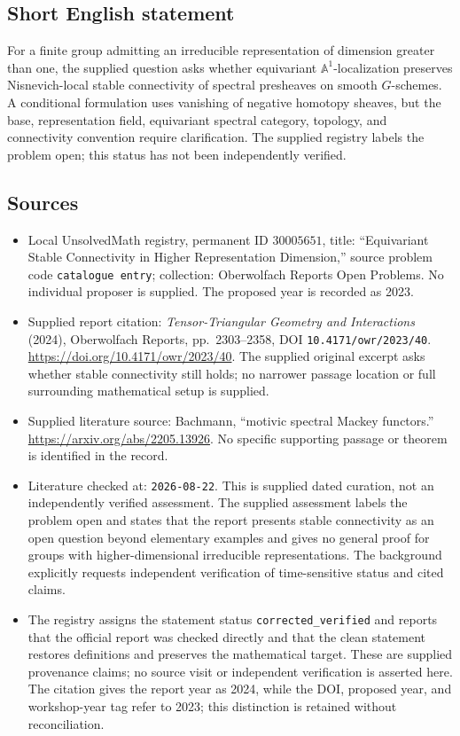 \documentclass[11pt]{article}
\begin{document}
\subsection{Short English statement}
For a finite group admitting an irreducible representation of dimension greater than one, the supplied question asks whether equivariant \(\mathbb A^{1}\)-localization preserves Nisnevich-local stable connectivity of spectral presheaves on smooth \(G\)-schemes. A conditional formulation uses vanishing of negative homotopy sheaves, but the base, representation field, equivariant spectral category, topology, and connectivity convention require clarification. The supplied registry labels the problem open; this status has not been independently verified.
\subsection{Sources}
\begin{itemize}
\item Local UnsolvedMath registry, permanent ID \(30005651\), title: ``Equivariant Stable Connectivity in Higher Representation Dimension,'' source problem code \texttt{catalogue entry}; collection: Oberwolfach Reports Open Problems. No individual proposer is supplied. The proposed year is recorded as 2023.
\item Supplied report citation: \emph{Tensor-Triangular Geometry and Interactions} (2024), Oberwolfach Reports, pp.\ 2303--2358, DOI \texttt{10.4171/owr/2023/40}. \url{https://doi.org/10.4171/owr/2023/40}. The supplied original excerpt asks whether stable connectivity still holds; no narrower passage location or full surrounding mathematical setup is supplied.
\item Supplied literature source: Bachmann, ``motivic spectral Mackey functors.'' \url{https://arxiv.org/abs/2205.13926}. No specific supporting passage or theorem is identified in the record.
\item Literature checked at: \texttt{2026-08-22}. This is supplied dated curation, not an independently verified assessment. The supplied assessment labels the problem open and states that the report presents stable connectivity as an open question beyond elementary examples and gives no general proof for groups with higher-dimensional irreducible representations. The background explicitly requests independent verification of time-sensitive status and cited claims.
\item The registry assigns the statement status \texttt{corrected\_verified} and reports that the official report was checked directly and that the clean statement restores definitions and preserves the mathematical target. These are supplied provenance claims; no source visit or independent verification is asserted here. The citation gives the report year as 2024, while the DOI, proposed year, and workshop-year tag refer to 2023; this distinction is retained without reconciliation.
\end{itemize}
\end{document}
